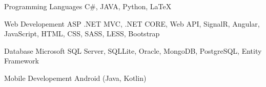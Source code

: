 


\begin{cvskills}


\cvskill
{Programming Languages} %
{C\#, JAVA, Python, LaTeX} %


\cvskill
{Web Developement} %
{ASP .NET MVC, .NET CORE, Web API, SignalR, Angular, JavaScript, HTML, CSS, SASS, LESS, Bootstrap} %


\cvskill
{Database} %
{Microsoft SQL Server, SQLLite, Oracle, MongoDB, PostgreSQL, Entity Framework} %


\cvskill
{Mobile Developement} %
{Android (Java, Kotlin)} %


\end{cvskills}
